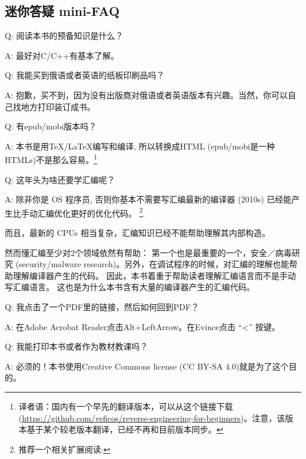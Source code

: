\documentclass[UTF8,nofonts]{ctexart}
\begin{document}

\subsection*{迷你答疑 mini-FAQ}


\par Q: 阅读本书的预备知识是什么？
\par A: 最好对C/C++有基本了解。
\par Q: 我能买到俄语或者英语的纸板印刷品吗？
\par A: 抱歉，买不到，因为没有出版商对俄语或者英语版本有兴趣。当然，你可以自己找地方打印装订成书。

\par Q: 有epub/mobi版本吗？
\par A: 本书是用TeX/LaTeX编写和编译, 所以转换成HTML (epub/mobi是一种HTMLs)不是那么容易。\footnote{译者语：国内有一个早先的翻译版本，可以从这个链接下载 (\url{https://github.com/veficos/reverse-engineering-for-beginners})。注意，该版本基于某个较老版本翻译，已经不再和目前版本同步。}


\par Q: 这年头为啥还要学汇编呢？
\par A: 除非你是 \ac{OS} 程序员, 否则你基本不需要写汇编\textemdash{}最新的编译器 (2010s) 已经能产生比手动汇编优化更好的优化代码。 \footnote{推荐一个相关扩展阅读: \InSqBrackets{\AgnerFog}}.

而且，最新的 \ac{CPU}s 相当复杂，汇编知识已经不能帮助理解其内部构造。

然而懂汇编至少对2个领域依然有帮助：
第一个也是最重要的一个，安全／病毒研究 (security/malware research)。另外，在调试程序的时候，对汇编的理解也能帮助理解编译器产生的代码。
因此，本书着重于帮助读者理解汇编语言而不是手动写汇编语言。
这也是为什么本书含有大量的编译器产生的汇编代码。

\par Q: 我点击了一个PDF里的链接，然后如何回到PDF？
\par A: 在Adobe Acrobat Reader点击Alt+LeftArrow。在Evince点击 ``<'' 按键。

\par Q: 我能打印本书或者作为教材教课吗？
\par A: 必须的！本书使用Creative Commons license (CC BY-SA 4.0)就是为了这个目的。
\end{document}

